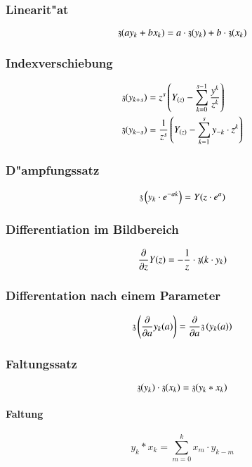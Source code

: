 \subsubsection{Linearit"at}
\begin{equation}
	\ztf(ay_k+bx_k)=a\cdot\ztf(y_k)+b\cdot\ztf(x_k)
\end{equation}

\subsubsection{Indexverschiebung}
\begin{align}
	\ztf(y_{k+s}) &= z^s\left({Y_{(z)}-\sum\limits_{k=0}^{s-1}\frac{y^k}{z^k}}\right) \\
	\ztf(y_{k-s}) &= \frac{1}{z^s}\left({Y_{(z)}-\sum\limits_{k=1}^{s}y_{-k}\cdot z^k}\right)
\end{align}

\subsubsection{D"ampfungssatz}
\begin{equation}
	\ztf\left(y_k\cdot e^{-ak}\right) = Y(z\cdot e^a)
\end{equation}

\subsubsection{Differentiation im Bildbereich}
\begin{equation}
	\frac{\partial}{\partial z}Y(z)=-\frac{1}{z}\cdot\ztf(k\cdot y_k)
\end{equation}

\subsubsection{Differentation nach einem Parameter}
\begin{equation}
	\ztf\left(\frac{\partial}{\partial a}y_k(a)\right)=\frac{\partial}{\partial a}\ztf\left(y_k(a)\right)
\end{equation}

\subsubsection{Faltungssatz}
\begin{equation}
	\ztf(y_k)\cdot\ztf(x_k)=\ztf(y_k\ast x_k)
\end{equation}
\paragraph{Faltung}
\begin{equation}
	y_k\ast x_k =\sum\limits_{m=0}^k x_m\cdot y_{k-m}
\end{equation}

